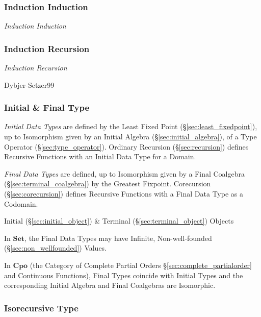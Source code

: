 \subsubsection{Induction Induction}\label{sec:induction_induction}

\emph{Induction Induction}



\subsubsection{Induction Recursion}\label{sec:induction_recursion}

\emph{Induction Recursion}

Dybjer-Setzer99



\subsubsection{Initial \& Final Type}\label{sec:initial_final_type}

\emph{Initial Data Types} are defined by the Least Fixed Point
(\S\ref{sec:least_fixedpoint}), up to Isomorphism given by an Initial
Algebra (\S\ref{sec:initial_algebra}), of a Type Operator
(\S\ref{sec:type_operator}). Ordinary Recursion
(\S\ref{sec:recursion}) defines Recursive Functions with an Initial
Data Type for a Domain.

\emph{Final Data Types} are defined, up to Isomorphism given by a
Final Coalgebra (\S\ref{sec:terminal_coalgebra}) by the Greatest
Fixpoint. Corecursion (\S\ref{sec:corecursion}) defines Recursive
Functions with a Final Data Type as a Codomain.

Initial (\S\ref{sec:initial_object}) \& Terminal
(\S\ref{sec:terminal_object}) Objects

In $\mathbf{Set}$, the Final Data Types may have Infinite,
Non-well-founded (\S\ref{sec:non_wellfounded}) Values.

In $\mathbf{Cpo}$ (the Category of Complete Partial Orders
\S\ref{sec:complete_partialorder} and Continuous Functions), Final
Types coincide with Initial Types and the corresponding Initial
Algebra and Final Coalgebras are Isomorphic.



\subsubsection{Isorecursive Type}\label{sec:isorecursive_type}

